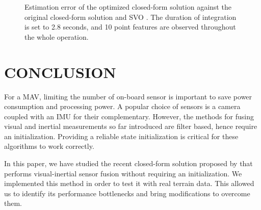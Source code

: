 \documentclass[letterpaper, 10 pt, conference]{ieeeconf}  %
\begin{document}
\begin{figure}
   \centering
   \resizebox{0.7\columnwidth}{!}{}
   \caption{Estimation error of the optimized closed-form solution against the original closed-form solution \cite{Martinelli2014} and SVO \cite{Forster2014}. The duration of integration is set to 2.8 seconds, and 10 point features are observed throughout the whole operation.}
\end{figure}






\section{CONCLUSION}

For a MAV, limiting the number of on-board sensor is important to save power consumption and processing power.
A popular choice of sensors is a camera coupled with an IMU for their complementary.
However, the methods for fusing visual and inertial measurements so far introduced are filter based, hence require an initialization.
Providing a reliable state initialization is critical for these algorithms to work correctly.

In this paper, we have studied the recent closed-form solution proposed by \cite{Martinelli2014} that performs visual-inertial sensor fusion without requiring an initialization.
We implemented this method in order to test it with real terrain data.
This allowed us to identify its performance bottlenecks and bring modifications to overcome them.
\end{document}
